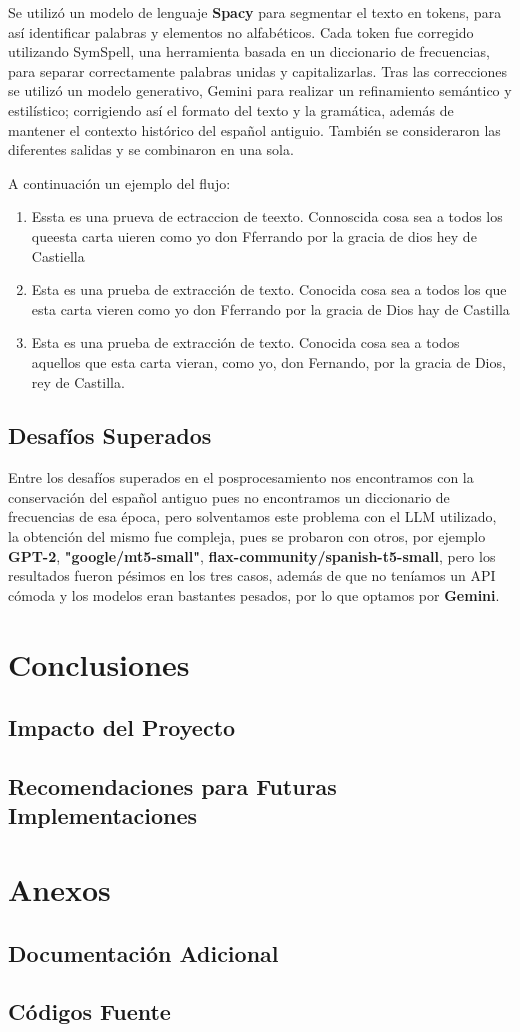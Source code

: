 \documentclass[11pt,a4paper]{article}
\begin{document}
Se utiliz\'o un modelo de lenguaje \textbf{Spacy} para segmentar el texto en tokens, para as\'i identificar palabras y elementos no alfab\'eticos. Cada token fue corregido utilizando SymSpell, una herramienta basada en un diccionario de frecuencias, para separar correctamente palabras unidas y capitalizarlas. Tras  las correcciones se utiliz\'o un modelo generativo, Gemini para realizar un refinamiento sem\'antico y estil\'istico; corrigiendo as\'i el formato del texto y la gram\'atica, adem\'as de mantener el contexto hist\'orico del español antiguio. Tambi\'en se consideraron las diferentes salidas y se combinaron en una sola.

A continuaci\'on un ejemplo del flujo:

\begin{enumerate}
    \item Essta es una prueva de ectraccion de teexto. Connoscida cosa sea a todos los queesta carta uieren como yo don Fferrando por la gracia de dios hey de Castiella
    \item Esta es una prueba de extracción de texto. Conocida cosa sea a todos los que esta carta vieren como yo don Fferrando por la gracia de Dios hay de Castilla
    \item Esta es una prueba de extracción de texto. Conocida cosa sea a todos aquellos que esta carta vieran, como yo, don Fernando, por la gracia de Dios, rey de Castilla.
\end{enumerate}

\subsection{Desafíos Superados}

Entre los desaf\'ios superados en el posprocesamiento nos encontramos con la conservaci\'on del español antiguo pues no encontramos un diccionario de frecuencias de esa época, pero solventamos este problema con el LLM utilizado, la obtención del mismo fue compleja, pues se probaron con otros, por ejemplo \textbf{GPT-2}, \textbf{"google/mt5-small"}, \textbf{flax-community/spanish-t5-small}, pero los resultados fueron p\'esimos en los tres casos, adem\'as de que no ten\'iamos un API c\'omoda y los modelos eran bastantes pesados, por lo que optamos por \textbf{Gemini}.

\section{Conclusiones} \subsection{Impacto del Proyecto} \subsection{Recomendaciones para Futuras Implementaciones}

\appendix \section{Anexos} \subsection{Documentación Adicional} \subsection{Códigos Fuente}

 
\end{document}
